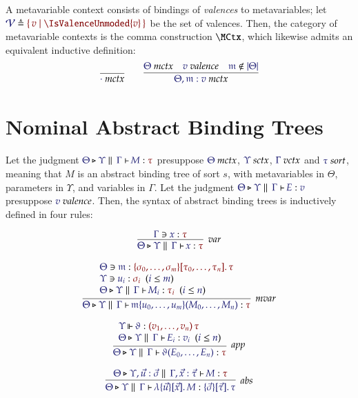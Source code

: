 \documentclass[11pt]{article}
\theoremstyle{definition}
\theoremstyle{remark}
\numberwithin{equation}{section}
\begin{document}
A metavariable context consists of bindings of \emph{valences} to
metavariables; let $\Define{\Valences}{\MkSet{v\mid \IsValenceUnmoded{v}}}$ be the set
of valences. Then, the category of metavariable contexts is the comma
construction $\MCtx$, which likewise admits an equivalent inductive definition:
\begin{gather*}
  \infer{
    \IsMetaCtx{\cdot}
  }{
  }
\qquad
  \infer{
    \IsMetaCtx{\Theta,\MV{m}:v}
  }{
    \IsMetaCtx{\Theta}
&
    \IsValence{v}
&
    \NotIn{\MV{m}}{\Dom\Theta}
  }
\end{gather*}



\section{Nominal Abstract Binding Trees}

Let the judgment $\IsAbt{\Theta}{\Upsilon}{\Gamma}{M}{\tau}$ presuppose
$\IsMetaCtx{\Theta}$, $\IsSymCtx\Upsilon$, $\IsVarCtx\Gamma$ and
$\IsSort{\tau}$, meaning that $M$ is an abstract binding tree of sort $s$, with
metavariables in $\Theta$, parameters in $\Upsilon$, and variables in $\Gamma$.
Let the judgment $\IsBTm{\Theta}{\Upsilon}{\Gamma}{E}{v}$ presuppose
$\IsValence{v}$. Then, the syntax of abstract binding trees is inductively
defined in four rules:

\begin{gather*}
  \infer[\textit{var}]{
    \IsAbt{\Theta}{\Upsilon}{\Gamma}{x}{\tau}
  }{
    \Lookup{\Gamma}{x}{\tau}
  }
\\[6pt]
  \infer[\textit{mvar}]{
    \IsAbt{\Theta}{\Upsilon}{\Gamma}{
      \MApp{\MV{m}}{u_0,\dots,u_m}{M_0,\dots,M_n}
    }{\tau}
  }{
    \begin{array}{l}
      \Lookup{\Theta}{\MV{m}}{
        \MkValence{
          \sigma_0,\dots,\sigma_m
        }{
          \tau_0,\dots,\tau_n
        }{\tau}
      }
\\
      \HypJ{
        \Lookup{\Upsilon}{u_i}{\sigma_i}
      }{\Leq{i}{m}}
\\
      \HypJ{
        \IsAbt{\Theta}{\Upsilon}{\Gamma}{M_i}{\tau_i}
      }{\Leq{i}{n}}
    \end{array}
  }
\\[6pt]
  \infer[\textit{app}]{
    \IsAbt{\Theta}{\Upsilon}{\Gamma}{
      \App{\vartheta}{E_0,\dots,E_n}
    }{\tau}
  }{
    \begin{array}{l}
      \IsOperator{\Upsilon}{\vartheta}{
        \MkArity{v_1,\dots,v_n}{\tau}
      }
\\
      \HypJ{
        \IsBTm{\Theta}{\Upsilon}{\Gamma}{E_i}{v_i}
      }{\Leq{i}{n}}
    \end{array}
  }
\\[6pt]
  \infer[\textit{abs}]{
    \IsBTm{\Theta}{\Upsilon}{\Gamma}{
      \MkBTm{\vec{u}}{\vec{x}}{M}
    }{
      \MkValence{\vec{\sigma}}{\vec{\tau}}{\tau}
    }
  }{
    \IsAbt{
      \Theta
    }{
      \Upsilon, \vec{u}:\vec{\sigma}
    }{
      \Gamma,\vec{x}:{\vec{\tau}}
    }{
      M
    }{\tau}
  }
\end{gather*}
\end{document}
